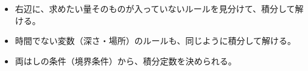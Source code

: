 \makeatletter
\newcommand\bkvidhead[1]{\par\addvspace{6pt}\Needspace{6\baselineskip}\noindent{\sffamily\bfseries\color{\bkTT}#1}\par\nobreak\vspace{2pt}}
\newcommand\bkvidl{\par\vspace{1pt}\noindent\hangindent=2.6\zw\hangafter=0\relax}
\newcommand\bkvidframe[2][100mm]{\par\addvspace{4pt}{\centering\tikz\node[draw=\bkTT, line width=0.9pt, fill=bkTheme!8, rounded corners=1.5mm, inner xsep=5mm, inner ysep=2.5mm, align=center, text width=#1]{#2};\par}\addvspace{4pt}\noindent\ignorespaces}
\newcommand\bkvidcard[4]{\begin{scope}[shift={#1}]
  \filldraw[fill=white, draw=bkInk!60, line width=0.7pt, rounded corners=1.5mm] (0,0) rectangle (38,23);
  \node[font=\sffamily\bfseries\footnotesize, anchor=north west] at (1.2,22.4) {#2};
  \node[anchor=center, font=\small] at (19,11.6) {#3};
  \node[font=\sffamily\footnotesize, anchor=south] at (19,1) {#4};
\end{scope}}
\makeatother


\begin{goal}
\begin{itemize}[label={\color{\bkTT}●}, leftmargin=1.6\zw, itemsep=0pt, topsep=1pt]
\item {}\enspace 右辺に、求めたい量そのものが入っていないルールを見分けて、積分して解ける。
\item {}\enspace 時間でない変数（深さ・場所）のルールも、同じように積分して解ける。
\item {}\enspace 両はしの条件（境界条件）から、積分定数を決められる。
\end{itemize}
\end{goal}

